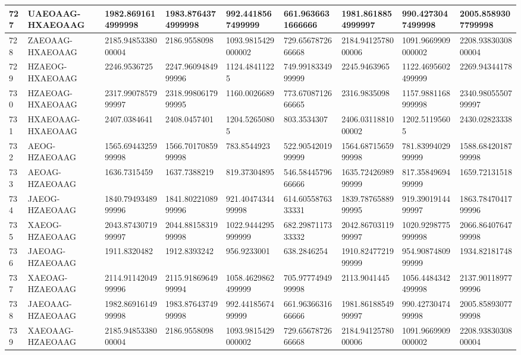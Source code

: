 {\begin{longtable}{|l|l|l|l|l|l|l|l|l|}
        727 & UAEOAAG-HXAEOAAG & 1982.8691614999998 & 1983.8764374999998 & 992.4418567499999 & 661.9636631666666 & 1981.8618854999997 & 990.4273047499998 & 2005.8589307799998 \\ \hline
        728 & ZAEOAAG-HXAEOAAG & 2185.9485338000004 & 2186.9558098 & 1093.9815429000002 & 729.6567872666668 & 2184.9412578000006 & 1091.9669909000002 & 2208.9383030800004 \\ \hline
        729 & HZAEOG-HXAEOAAG & 2246.9536725 & 2247.9609484999996 & 1124.48411225 & 749.9918334999999 & 2245.9463965 & 1122.4695602499999 & 2269.94344178 \\ \hline
        730 & HZAEOAG-HXAEOAAG & 2317.9907857999997 & 2318.9980617999995 & 1160.0026689 & 773.6708712666665 & 2316.9835098 & 1157.9881168999998 & 2340.9805550799997 \\ \hline
        731 & HXAEOAAG-HXAEOAAG & 2407.0384641 & 2408.0457401 & 1204.52650805 & 803.3534307 & 2406.0311881000002 & 1202.51195605 & 2430.02823338 \\ \hline
        732 & AEOG-HZAEOAAG & 1565.6944325999998 & 1566.7017085999998 & 783.8544923 & 522.9054201999999 & 1564.6871565999998 & 781.8399402999999 & 1588.6842018799998 \\ \hline
        733 & AEOAG-HZAEOAAG & 1636.7315459 & 1637.7388219 & 819.37304895 & 546.5844579666666 & 1635.7242698999999 & 817.3584969499999 & 1659.72131518 \\ \hline
        734 & JAEOG-HZAEOAAG & 1840.7949348999996 & 1841.8022108999996 & 921.4047434499998 & 614.6055876333331 & 1839.7876588999995 & 919.3901914499997 & 1863.7847041799996 \\ \hline
        735 & XAEOG-HZAEOAAG & 2043.8743071999997 & 2044.8815831999998 & 1022.9444295999999 & 682.2987117333332 & 2042.8670311999997 & 1020.9298775999998 & 2066.8640764799998 \\ \hline
        736 & JAEOAG-HZAEOAAG & 1911.8320482 & 1912.8393242 & 956.9233001 & 638.2846254 & 1910.8247721999999 & 954.9087480999999 & 1934.82181748 \\ \hline
        737 & XAEOAG-HZAEOAAG & 2114.9114204999996 & 2115.9186964999994 & 1058.4629862499999 & 705.9777494999998 & 2113.9041445 & 1056.4484342499998 & 2137.9011897799996 \\ \hline
        738 & JAEOAAG-HZAEOAAG & 1982.8691614999998 & 1983.8764374999998 & 992.4418567499999 & 661.9636631666666 & 1981.8618854999997 & 990.4273047499998 & 2005.8589307799998 \\ \hline
        739 & XAEOAAG-HZAEOAAG & 2185.9485338000004 & 2186.9558098 & 1093.9815429000002 & 729.6567872666668 & 2184.9412578000006 & 1091.9669909000002 & 2208.9383030800004 \\ \hline

\end{longtable}}

